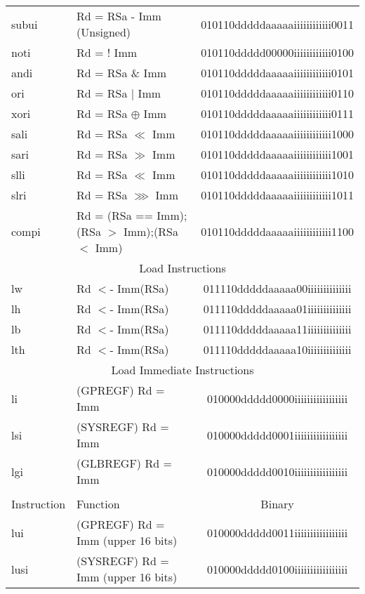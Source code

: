 \documentclass[letterpaper, 11pt]{article}
\begin{document}
\begin{center}
\begin{longtable}{|l|l|c|}
			subui		& Rd = RSa - Imm (Unsigned)					 	& 010110dddddaaaaaiiiiiiiiiiii0011 \\
			noti		& Rd = ! Imm									& 010110ddddd00000iiiiiiiiiiii0100 \\
			andi		& Rd = RSa \& Imm								& 010110dddddaaaaaiiiiiiiiiiii0101 \\
			ori			& Rd = RSa $|$ Imm 								& 010110dddddaaaaaiiiiiiiiiiii0110 \\
			xori		& Rd = RSa $\oplus$ Imm 						& 010110dddddaaaaaiiiiiiiiiiii0111 \\
			sali		& Rd = RSa $\ll$ Imm 							& 010110dddddaaaaaiiiiiiiiiiii1000 \\
			sari		& Rd = RSa $\gg$ Imm 							& 010110dddddaaaaaiiiiiiiiiiii1001 \\
			slli		& Rd = RSa $\ll$ Imm 							& 010110dddddaaaaaiiiiiiiiiiii1010 \\
			slri		& Rd = RSa $ \ggg  $ Imm 						& 010110dddddaaaaaiiiiiiiiiiii1011 \\
			compi		& Rd = (RSa == Imm);(RSa $>$ Imm);(RSa $<$ Imm)	& 010110dddddaaaaaiiiiiiiiiiii1100 \\
			\hline
			\multicolumn{3}{|c|}{Load Instructions} \\ \hline
			lw			& Rd $<$- Imm(RSa)								& 011110dddddaaaaa00iiiiiiiiiiiiii \\
			lh			& Rd $<$- Imm(RSa)								& 011110dddddaaaaa01iiiiiiiiiiiiii \\
			lb			& Rd $<$- Imm(RSa)								& 011110dddddaaaaa11iiiiiiiiiiiiii \\
			lth			& Rd $<$- Imm(RSa)								& 011110dddddaaaaa10iiiiiiiiiiiiii \\
			\hline
			\multicolumn{3}{|c|}{Load Immediate Instructions} \\ \hline
			li			& (GPREGF) Rd = Imm								& 010000ddddd0000iiiiiiiiiiiiiiiii \\
			lsi			& (SYSREGF) Rd = Imm							& 010000ddddd0001iiiiiiiiiiiiiiiii \\
			lgi			& (GLBREGF) Rd = Imm							& 010000ddddd0010iiiiiiiiiiiiiiiii \\
			\hline \newpage
			\hline
			\multicolumn{3}{|c|}{Load Immediate Instructions (cont.)} \\ \hline
			Instruction & Function 										& Binary \\ \hline
			lui			& (GPREGF) Rd = Imm	(upper 16 bits)				& 010000ddddd0011iiiiiiiiiiiiiiiii \\
			lusi		& (SYSREGF) Rd = Imm (upper 16 bits)			& 010000ddddd0100iiiiiiiiiiiiiiiii \\

\end{longtable}
\end{center}
\end{document}
